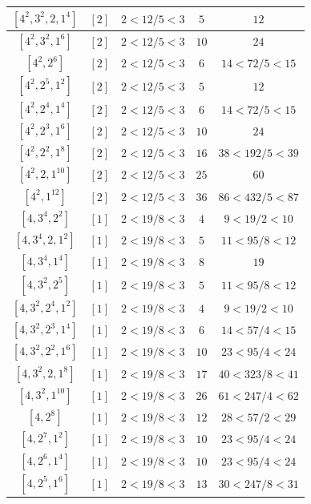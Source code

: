 \documentclass{article}%
\begin{document}
\begin{center}
\begin{longtable}{||c|c|c|c|c||}
$[4^{2}, 3^{2}, 2, 1^{4}]$ & $[2]$ & $2 < 12/5 < 3$ & $5$ & $12$ \\ \hline 
$[4^{2}, 3^{2}, 1^{6}]$ & $[2]$ & $2 < 12/5 < 3$ & $10$ & $24$ \\ \hline 
$[4^{2}, 2^{6}]$ & $[2]$ & $2 < 12/5 < 3$ & $6$ & $14 < 72/5 < 15$ \\ \hline 
$[4^{2}, 2^{5}, 1^{2}]$ & $[2]$ & $2 < 12/5 < 3$ & $5$ & $12$ \\ \hline 
$[4^{2}, 2^{4}, 1^{4}]$ & $[2]$ & $2 < 12/5 < 3$ & $6$ & $14 < 72/5 < 15$ \\ \hline 
$[4^{2}, 2^{3}, 1^{6}]$ & $[2]$ & $2 < 12/5 < 3$ & $10$ & $24$ \\ \hline 
$[4^{2}, 2^{2}, 1^{8}]$ & $[2]$ & $2 < 12/5 < 3$ & $16$ & $38 < 192/5 < 39$ \\ \hline 
$[4^{2}, 2, 1^{10}]$ & $[2]$ & $2 < 12/5 < 3$ & $25$ & $60$ \\ \hline 
$[4^{2}, 1^{12}]$ & $[2]$ & $2 < 12/5 < 3$ & $36$ & $86 < 432/5 < 87$ \\ \hline 
$[4, 3^{4}, 2^{2}]$ & $[1]$ & $2 < 19/8 < 3$ & $4$ & $9 < 19/2 < 10$ \\ \hline 
$[4, 3^{4}, 2, 1^{2}]$ & $[1]$ & $2 < 19/8 < 3$ & $5$ & $11 < 95/8 < 12$ \\ \hline 
$[4, 3^{4}, 1^{4}]$ & $[1]$ & $2 < 19/8 < 3$ & $8$ & $19$ \\ \hline 
$[4, 3^{2}, 2^{5}]$ & $[1]$ & $2 < 19/8 < 3$ & $5$ & $11 < 95/8 < 12$ \\ \hline 
$[4, 3^{2}, 2^{4}, 1^{2}]$ & $[1]$ & $2 < 19/8 < 3$ & $4$ & $9 < 19/2 < 10$ \\ \hline 
$[4, 3^{2}, 2^{3}, 1^{4}]$ & $[1]$ & $2 < 19/8 < 3$ & $6$ & $14 < 57/4 < 15$ \\ \hline 
$[4, 3^{2}, 2^{2}, 1^{6}]$ & $[1]$ & $2 < 19/8 < 3$ & $10$ & $23 < 95/4 < 24$ \\ \hline 
$[4, 3^{2}, 2, 1^{8}]$ & $[1]$ & $2 < 19/8 < 3$ & $17$ & $40 < 323/8 < 41$ \\ \hline 
$[4, 3^{2}, 1^{10}]$ & $[1]$ & $2 < 19/8 < 3$ & $26$ & $61 < 247/4 < 62$ \\ \hline 
$[4, 2^{8}]$ & $[1]$ & $2 < 19/8 < 3$ & $12$ & $28 < 57/2 < 29$ \\ \hline 
$[4, 2^{7}, 1^{2}]$ & $[1]$ & $2 < 19/8 < 3$ & $10$ & $23 < 95/4 < 24$ \\ \hline 
$[4, 2^{6}, 1^{4}]$ & $[1]$ & $2 < 19/8 < 3$ & $10$ & $23 < 95/4 < 24$ \\ \hline 
$[4, 2^{5}, 1^{6}]$ & $[1]$ & $2 < 19/8 < 3$ & $13$ & $30 < 247/8 < 31$ \\ \hline 

\end{longtable}
\end{center}
\end{document}
